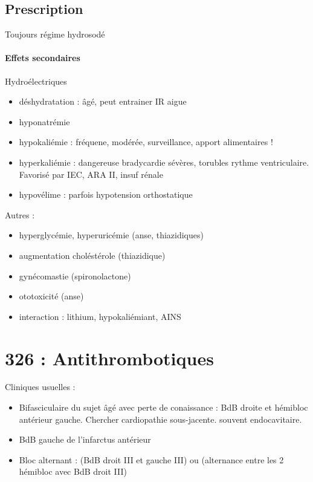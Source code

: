 \documentclass{article}
\begin{document}
\subsection{Prescription}
Toujours régime hydrosodé

\paragraph{Effets secondaires}
Hydroélectriques 
\begin{itemize}
  \item déshydratation : âgé, peut entrainer IR aigue
  \item hyponatrémie 
  \item hypokaliémie : fréquene, modérée, surveillance, apport alimentaires
    !
  \item hyperkaliémie : dangereuse \danger{} bradycardie sévères, torubles
    rythme ventriculaire. Favorisé par IEC, ARA II, insuf rénale
  \item hypovélime : parfois hypotension orthostatique
\end{itemize}
Autres : 
\begin{itemize}
  \item hyperglycémie, hyperuricémie (anse, thiazidiques)
  \item augmentation choléstérole (thiazidique)
  \item gynécomastie (spironolactone)
  \item ototoxicité (anse)
  \item interaction : lithium, hypokaliémiant, AINS
\end{itemize}







\section{326 : Antithrombotiques}%
\label{sec:326_antithrombotiques}


Cliniques usuelles : 
\begin{itemize}
  \item Bifasciculaire du sujet âgé avec perte de conaissance : BdB droite et
    hémibloc antérieur gauche. Chercher cardiopathie sous-jacente. souvent
    endocavitaire.
  \item BdB gauche de l'infarctus antérieur
  \item Bloc alternant : (BdB droit III et gauche III) ou (alternance
    entre les 2 hémibloc avec BdB droit III)
\end{itemize}
\end{document}
